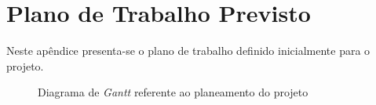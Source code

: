 \chapter{Plano de Trabalho Previsto}
\label{AppendixA}
Neste apêndice presenta-se o plano de trabalho definido inicialmente para o projeto.

\begin{figure}[!ht]
    \centering
    \caption{Diagrama de \textit{Gantt} referente ao planeamento do projeto}
\end{figure}
